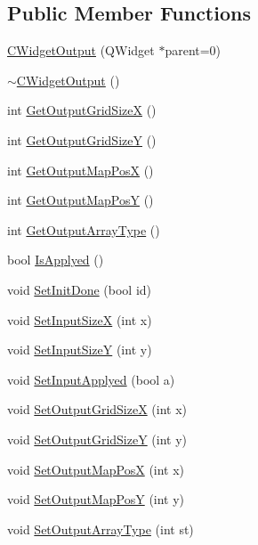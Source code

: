 \subsection*{Public Member Functions}
\begin{DoxyCompactItemize}
\item 
\hyperlink{classCWidgetOutput_aa50b2f8c1d87552f95a98b89cdceb2e7}{CWidgetOutput} (QWidget $\ast$parent=0)
\item 
\hyperlink{classCWidgetOutput_ae061db04883a78a2cd0f5bc01e37ec6d}{$\sim$CWidgetOutput} ()
\item 
int \hyperlink{classCWidgetOutput_acf934dd6b1c0152fd843a146f1ae1db0}{GetOutputGridSizeX} ()
\item 
int \hyperlink{classCWidgetOutput_ae432e6da755550423efda0da5d35b59f}{GetOutputGridSizeY} ()
\item 
int \hyperlink{classCWidgetOutput_ad8ad2678d28bb1193af426e900047094}{GetOutputMapPosX} ()
\item 
int \hyperlink{classCWidgetOutput_a255be0716b77039669bef07bb78c95b8}{GetOutputMapPosY} ()
\item 
int \hyperlink{classCWidgetOutput_abbebacde13cb2cf11c6cf5a14f7756cf}{GetOutputArrayType} ()
\item 
bool \hyperlink{classCWidgetOutput_ada41e67db63edcb77452600ef0eaea9a}{IsApplyed} ()
\item 
void \hyperlink{classCWidgetOutput_a517c98711eaa20bb3a370181fe1b0b86}{SetInitDone} (bool id)
\item 
void \hyperlink{classCWidgetOutput_a50817d0767670f5ddf46585de5892d26}{SetInputSizeX} (int x)
\item 
void \hyperlink{classCWidgetOutput_a71c98ee451faa09a9c53842aaae70aca}{SetInputSizeY} (int y)
\item 
void \hyperlink{classCWidgetOutput_a9c4fe2d7649b6c5273df945f69cbec22}{SetInputApplyed} (bool a)
\item 
void \hyperlink{classCWidgetOutput_a1c5fd5000d450fc31ad5246efc914a41}{SetOutputGridSizeX} (int x)
\item 
void \hyperlink{classCWidgetOutput_ad30ea04a0d848bb26848b9f236f231a6}{SetOutputGridSizeY} (int y)
\item 
void \hyperlink{classCWidgetOutput_a585e2d0af4e9bb011634cd8202ac62bd}{SetOutputMapPosX} (int x)
\item 
void \hyperlink{classCWidgetOutput_a51929359458a26fe65a655b35d3e7ed8}{SetOutputMapPosY} (int y)
\item 
void \hyperlink{classCWidgetOutput_a91ef6edea639a31229e15b9659b64954}{SetOutputArrayType} (int st)
\end{DoxyCompactItemize}
